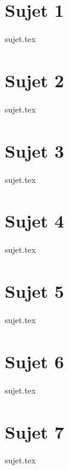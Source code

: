 \documentclass[a4paper, 11pt]{book}
\begin{document}

\chapter{Sujet 1}
\resetQ
{sujet.tex}

\chapter{Sujet 2}
\resetQ
{sujet.tex}

\chapter{Sujet 3}
\resetQ
{sujet.tex}

\chapter{Sujet 4}
\resetQ
{sujet.tex}

\chapter{Sujet 5}
\resetQ
{sujet.tex}

\chapter{Sujet 6}
\resetQ
{sujet.tex}

\chapter{Sujet 7}
\resetQ
{sujet.tex}
\end{document}
